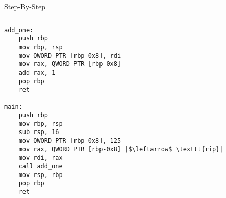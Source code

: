 \documentclass[hyphens,aspectratio=169]{beamer}
\begin{document}
\begin{frame}[fragile]{Step-By-Step}
    \begin{columns}
        \begin{column}{0.33\textwidth}
            \begin{verbatim}
add_one:
    push rbp
    mov rbp, rsp
    mov QWORD PTR [rbp-0x8], rdi
    mov rax, QWORD PTR [rbp-0x8]
    add rax, 1
    pop rbp
    ret

main:
    push rbp
    mov rbp, rsp
    sub rsp, 16
    mov QWORD PTR [rbp-0x8], 125
    mov rax, QWORD PTR [rbp-0x8] |$\leftarrow$ \texttt{rip}|
    mov rdi, rax
    call add_one
    mov rsp, rbp
    pop rbp
    ret
            \end{verbatim}
        \end{column}
        \begin{column}{0.33\textwidth}
\end{column}
\end{columns}
\end{frame}
\end{document}
